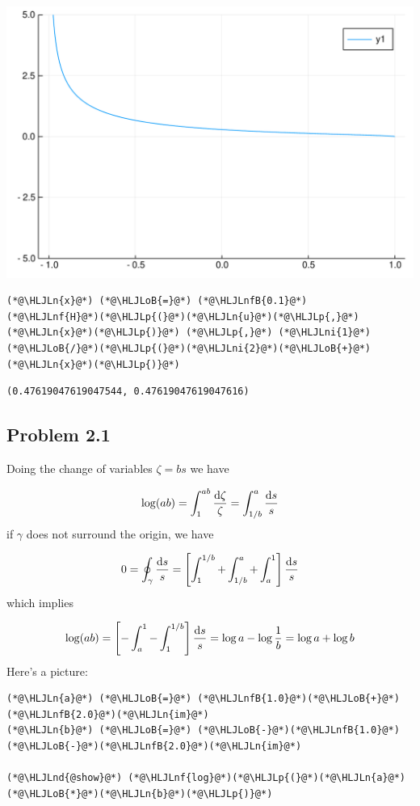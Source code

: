 \documentclass[12pt,a4paper]{article}
\newcommand{\HLJLn}[1]{#1}
\newcommand{\HLJLnd}[1]{\textcolor[RGB]{214,102,97}{#1}}
\newcommand{\HLJLnf}[1]{\textcolor[RGB]{66,102,213}{#1}}
\newcommand{\HLJLnfB}[1]{\textcolor[RGB]{59,151,46}{#1}}
\newcommand{\HLJLni}[1]{\textcolor[RGB]{59,151,46}{#1}}
\newcommand{\HLJLoB}[1]{\textcolor[RGB]{102,102,102}{\textbf{#1}}}
\newcommand{\HLJLp}[1]{#1}
\def\D{ {\rm d} }
\begin{document}
\includegraphics[width=\linewidth]{figures/Solutions2_17_1.pdf}

\begin{lstlisting}
(*@\HLJLn{x}@*) (*@\HLJLoB{=}@*) (*@\HLJLnfB{0.1}@*)
(*@\HLJLnf{H}@*)(*@\HLJLp{(}@*)(*@\HLJLn{u}@*)(*@\HLJLp{,}@*)(*@\HLJLn{x}@*)(*@\HLJLp{)}@*) (*@\HLJLp{,}@*) (*@\HLJLni{1}@*)(*@\HLJLoB{/}@*)(*@\HLJLp{(}@*)(*@\HLJLni{2}@*)(*@\HLJLoB{+}@*)(*@\HLJLn{x}@*)(*@\HLJLp{)}@*)
\end{lstlisting}

\begin{lstlisting}
(0.47619047619047544, 0.47619047619047616)
\end{lstlisting}


\subsection{Problem 2.1}
Doing the change of variables $\zeta = b s$ we have

\[
\log(ab) = \int_1^{ab} {\D \zeta \over \zeta} = \int_{1/b}^a {\D s \over s}
\]
if $\gamma$ does not surround the origin, we have

\[
0 = \oint_\gamma {\D s \over s} = \left[\int_1^{1/b} + \int_{1/b}^a + \int_a^1\right] {\D s \over s}
\]
which implies 

\[
\log(ab) = \left[-\int_a^1 -\int_1^{1/b} \right] {\D s \over s} = \log a - \log {1 \over b} = \log a + \log b
\]
Here's a picture:


\begin{lstlisting}
(*@\HLJLn{a}@*) (*@\HLJLoB{=}@*) (*@\HLJLnfB{1.0}@*)(*@\HLJLoB{+}@*)(*@\HLJLnfB{2.0}@*)(*@\HLJLn{im}@*)
(*@\HLJLn{b}@*) (*@\HLJLoB{=}@*) (*@\HLJLoB{-}@*)(*@\HLJLnfB{1.0}@*)(*@\HLJLoB{-}@*)(*@\HLJLnfB{2.0}@*)(*@\HLJLn{im}@*)

(*@\HLJLnd{@show}@*) (*@\HLJLnf{log}@*)(*@\HLJLp{(}@*)(*@\HLJLn{a}@*)(*@\HLJLoB{*}@*)(*@\HLJLn{b}@*)(*@\HLJLp{)}@*)
\end{lstlisting}
\end{document}
